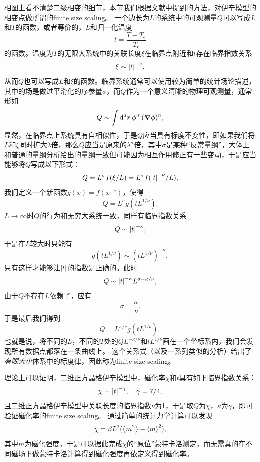 \documentclass[UTF8]{ctexart}
\begin{document}
相图上看不清楚二级相变的细节，本节我们根据文献\cite{sandvik2010computational}中提到的方法，对伊辛模型的相变点做所谓的finite size scaling。
一个边长为$L$的系统中的可观测量$Q$可以写成$L$和$T$的函数，或者等价的，$L$和归一化温度
\begin{equation}
    t = \frac{T - T_\text{c}}{T_\text{c}}
\end{equation}
的函数。温度为$T$的无限大系统中的关联长度$\xi$在临界点附近和$t$存在临界指数关系
\begin{equation}
    \xi \sim \abs{t}^{- \nu},
\end{equation}
从而$Q$也可以写成$L$和$\xi$的函数。临界系统通常可以使用较为简单的统计场论描述，其中的场是做过平滑化的序参量$\phi$，而$Q$作为一个意义清晰的物理可观测量，通常形如
\begin{equation}
    Q \sim \int \dd[d]{\vb*{r}} \phi^m (\grad{\phi})^n,
\end{equation}
显然，在临界点上系统具有自相似性，于是$Q$应当具有标度不变性，即如果我们将$L$和$\xi$同时扩大$\lambda$倍，那么$Q$应当是原来的$\lambda^\sigma$倍，其中$\sigma$是某种“反常量纲”，大体上和普通的量纲分析给出的量纲一致但可能因为相互作用修正有一些变动，于是应当能够将$Q$写成以下形式：
\begin{equation}
    Q = L^\sigma f(\xi / L) = L^\sigma f(\abs{t}^{- \nu} / L),
\end{equation}
我们定义一个新函数$g(x) = f(x^{-\nu})$，使得
\begin{equation}
    Q = L^\sigma g(t L^{1 / \nu}).
\end{equation}
$L \to \infty$时$Q$的行为和无穷大系统一致，同样有临界指数关系
\begin{equation}
    Q \sim \abs{t}^{- \kappa},
\end{equation}
于是在$L$较大时只能有
\[
    g(t L^{1 / \nu}) \sim (t L^{1 / \nu})^{- \kappa},
\]
只有这样才能够让$\abs{t}$的指数是正确的。此时
\[
    Q \sim \abs{t}^{- \kappa} L^{\sigma - \kappa / \nu},
\]
由于$Q$不存在$L$依赖了，应有
\[
    \sigma = \frac{\kappa}{\nu}.
\]
于是最后我们得到
\begin{equation}
    Q = L^{\kappa / \nu} g(t L^{1 / \nu}),
\end{equation}
也就是说，将不同的$L$，不同的$T$处的$Q L^{- \kappa / \nu}$和$t L^{1 / \nu}$画在一个坐标系内，我们会发现所有数据点都落在一条曲线上。
这个关系式（以及一系列类似的分析）给出了\emph{有限大小}体系中的标度律，因此称为finite size scaling。

理论上可以证明，二维正方晶格伊辛模型中，磁化率$\chi$和$t$具有如下临界指数关系：
\begin{equation}
    \chi \sim \abs{t}^{- \gamma}, \quad \gamma = 7 /4,
\end{equation}
且二维正方晶格伊辛模型中关联长度的临界指数$\nu$为1，于是取$Q$为$\chi$，$\kappa$为$\gamma$，即可验证磁化率的finite size scaling。
通过简单的统计力学计算可以发现
\begin{equation}
    \chi = \beta L^2 (\expval{m^2} - \expval{m}^2),
\end{equation}
其中$m$为磁化强度，于是可以据此完成$\chi$的“原位”蒙特卡洛测定，而无需真的在不同磁场下做蒙特卡洛计算得到磁化强度再依定义得到磁化率。
\end{document}
